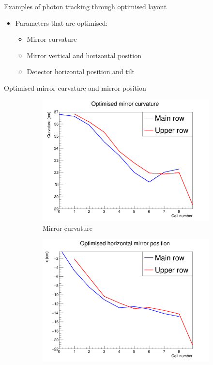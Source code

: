 \documentclass{beamer}
\begin{document}
\begin{frame}{Examples of photon tracking through optimised layout}
\begin{figure}
  \end{figure}
  \vspace{-0.3cm}
  \begin{itemize}
    \item{Parameters that are optimised:}
    \begin{itemize}
      \item{Mirror curvature}
      \item{Mirror vertical and horizontal position}
      \item{Detector horizontal position and tilt}
    \end{itemize}
  \end{itemize}
\end{frame}

\begin{frame}{Optimised mirror curvature and mirror position}
  \begin{figure}
    \centering
    \vspace{-0.2cm}
    \begin{subfigure}{0.5\textwidth}
      \includegraphics[width = 1.0\textwidth]{Plots/OptimisedMirrorCurvature.png}
      \caption{Mirror curvature}
    \end{subfigure}%
    \begin{subfigure}{0.5\textwidth}
      \includegraphics[width = 1.0\textwidth]{Plots/OptimisedMirrorX.png}

\end{subfigure}
\end{figure}
\end{frame}
\end{document}
